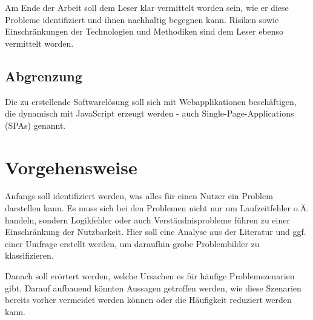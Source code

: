 Am Ende der Arbeit soll dem Leser klar vermittelt worden sein, wie er diese Probleme identifiziert und ihnen nachhaltig begegnen kann. Risiken sowie Einschränkungen der Technologien und Methodiken sind dem Leser ebenso vermittelt worden.

\subsection{Abgrenzung}

Die zu erstellende Softwarelösung soll sich mit Webapplikationen beschäftigen, die dynamisch mit JavaScript erzeugt werden - auch Single-Page-Applications (SPAs) genannt. 

%

\section{Vorgehensweise}

Anfangs soll identifiziert werden, was alles für einen Nutzer ein Problem darstellen kann. Es muss sich bei den Problemen nicht nur um Laufzeitfehler o.Ä. handeln, sondern Logikfehler oder auch Verständnisprobleme führen zu einer Einschränkung der Nutzbarkeit. Hier soll eine Analyse aus der Literatur und ggf. einer Umfrage erstellt werden, um daraufhin grobe Problembilder zu klassifizieren.

Danach soll erörtert werden, welche Ursachen es für häufige Problemszenarien gibt. Darauf aufbauend könnten Aussagen getroffen werden, wie diese Szenarien bereits vorher vermeidet werden können oder die Häufigkeit reduziert werden kann.

